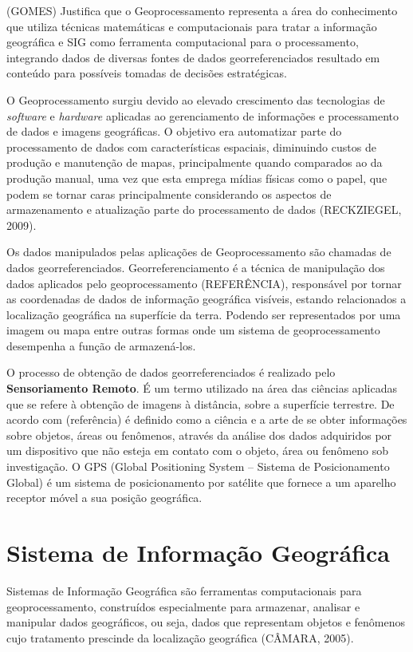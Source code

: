 \documentclass[
	12pt,				%
    oneside,			%
	a4paper,			%
	english,			%
	french,				%
	spanish,			%
	brazil,				%
	]{abntex2}
\begin{document}
(GOMES) Justifica que o Geoprocessamento representa a área do conhecimento que utiliza técnicas matemáticas e computacionais para tratar a informação geográfica e SIG como ferramenta computacional para o processamento, integrando dados de diversas fontes de dados georreferenciados resultado em conteúdo para possíveis tomadas de decisões estratégicas.

O Geoprocessamento surgiu devido ao elevado crescimento das tecnologias de \textit{software} e \textit{hardware} aplicadas ao gerenciamento de informações e processamento de dados e imagens geográficas. O objetivo era automatizar parte do processamento de dados com características espaciais, diminuindo custos de produção e manutenção de mapas, principalmente quando comparados ao da produção manual, uma vez que esta emprega mídias físicas como o papel, que podem se tornar caras principalmente considerando os aspectos de armazenamento e atualização parte do processamento de dados (RECKZIEGEL, 2009).

Os dados manipulados pelas aplicações de Geoprocessamento são chamadas de dados georreferenciados. Georreferenciamento é a técnica de manipulação dos dados aplicados pelo geoprocessamento (REFERÊNCIA), responsável por tornar as coordenadas de dados de informação geográfica visíveis, estando relacionados a localização geográfica na superfície da terra. Podendo ser representados por uma imagem ou mapa entre outras formas onde um sistema de geoprocessamento desempenha a função de armazená-los.

O processo de obtenção de dados georreferenciados é realizado pelo \textbf{Sensoriamento Remoto}. É um termo utilizado na área das ciências aplicadas que se refere à obtenção de imagens à distância, sobre a superfície terrestre. De acordo com (referência) é definido como a ciência e a arte de se obter informações sobre objetos, áreas ou fenômenos, através da análise dos dados adquiridos por um dispositivo que não esteja em contato com o objeto, área ou fenômeno sob investigação. O GPS (Global Positioning System – Sistema de Posicionamento Global) é um sistema de posicionamento por satélite que fornece a um aparelho receptor móvel a sua posição geográfica.

\section{Sistema de Informação Geográfica}
Sistemas de Informação Geográfica são ferramentas computacionais para geoprocessamento, construídos especialmente para armazenar, analisar e manipular dados geográficos, ou seja, dados que representam objetos e fenômenos cujo tratamento prescinde da localização geográfica (CÂMARA, 2005). 
\end{document}
